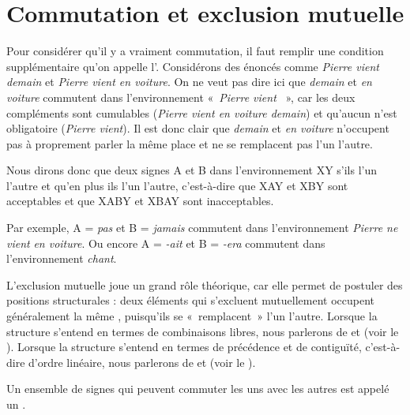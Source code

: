 \section{Commutation et exclusion mutuelle}\label{sec:2.2.1}

Pour considérer qu’il y a vraiment commutation, il faut remplir une condition supplémentaire qu’on appelle l’. Considérons des énoncés comme \textit{Pierre vient demain} et \textit{Pierre vient en voiture}. On ne veut pas dire ici que \textit{demain} et \textit{en voiture} commutent dans l’environnement «~\textit{Pierre vient {\longrule}}~», car les deux compléments sont cumulables (\textit{Pierre vient en voiture demain}) et qu’aucun n’est obligatoire (\textit{Pierre vient}). Il est donc clair que \textit{demain} et \textit{en voiture} n’occupent pas à proprement parler la même place et ne se remplacent pas l’un l’autre.

{Nous dirons donc que deux signes A et B  dans l’environnement X{\longrule}Y s’ils  l’un l’autre et qu’en plus ils  l’un l’autre, c’est-à-dire que XAY et XBY sont acceptables et que XABY et XBAY sont inacceptables.}

Par exemple, A = \textit{pas} et B = \textit{jamais} commutent dans l’environnement \textit{Pierre ne vient {\longrule}} \textit{en voiture}. Ou encore A = \textit{{}-ait} et B = \textit{{}-era} commutent dans l’environnement \textit{chant{\longrule}}.

L’exclusion mutuelle joue un grand rôle théorique, car elle permet de postuler des positions structurales : deux éléments qui s’excluent mutuellement occupent généralement la même , puisqu’ils se «~remplacent~» l’un l’autre. Lorsque la structure s’entend en termes de combinaisons libres, nous parlerons de  et  (voir le ). Lorsque la structure s’entend en termes de précédence et de contiguïté, c’est-à-dire d’ordre linéaire, nous parlerons de  et  (voir le ).

{Un ensemble de signes qui peuvent commuter les uns avec les autres est appelé un .}

